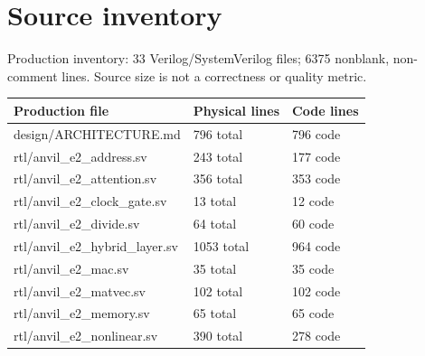 \documentclass[11pt,a4paper]{article}
\begin{document}
\appendix{}\section{Source inventory}

Production inventory: 33 Verilog/\allowbreak{}SystemVerilog files; 6375 nonblank,\allowbreak{} non-comment lines. Source size is not a correctness or quality metric.

{\small\renewcommand{\arraystretch}{1.18}\begin{longtable}{@{}L{0.55\textwidth}|L{0.18\textwidth}|L{0.18\textwidth}@{}}\toprule

\textbf{Production file} & \textbf{Physical lines} & \textbf{Code lines}\\\midrule\endhead

design/\allowbreak{}ARCHITECTURE.md & 796 total & 796 code\\[2pt]\hline

rtl/\allowbreak{}anvil\_\allowbreak{}e2\_\allowbreak{}address.sv & 243 total & 177 code\\[2pt]\hline

rtl/\allowbreak{}anvil\_\allowbreak{}e2\_\allowbreak{}attention.sv & 356 total & 353 code\\[2pt]\hline

rtl/\allowbreak{}anvil\_\allowbreak{}e2\_\allowbreak{}clock\_\allowbreak{}gate.sv & 13 total & 12 code\\[2pt]\hline

rtl/\allowbreak{}anvil\_\allowbreak{}e2\_\allowbreak{}divide.sv & 64 total & 60 code\\[2pt]\hline

rtl/\allowbreak{}anvil\_\allowbreak{}e2\_\allowbreak{}hybrid\_\allowbreak{}layer.sv & 1053 total & 964 code\\[2pt]\hline

rtl/\allowbreak{}anvil\_\allowbreak{}e2\_\allowbreak{}mac.sv & 35 total & 35 code\\[2pt]\hline

rtl/\allowbreak{}anvil\_\allowbreak{}e2\_\allowbreak{}matvec.sv & 102 total & 102 code\\[2pt]\hline

rtl/\allowbreak{}anvil\_\allowbreak{}e2\_\allowbreak{}memory.sv & 65 total & 65 code\\[2pt]\hline

rtl/\allowbreak{}anvil\_\allowbreak{}e2\_\allowbreak{}nonlinear.sv & 390 total & 278 code\\[2pt]\hline


\end{longtable}}
\end{document}
